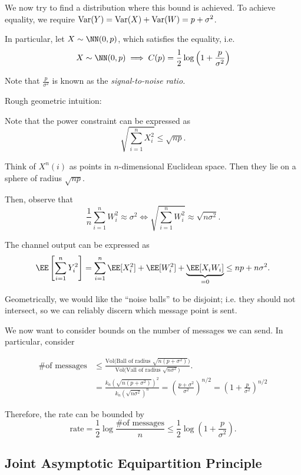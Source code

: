 We now try to find a distribution where this bound is achieved.  To achieve equality, we require $\text{Var}(Y) = \text{Var}(X) + \text{Var}(W) = p + \sigma^2$.  

In particular, let $X \sim \NN(0, p)$, which satisfies the equality, i.e.
\[
  X \sim \NN(0, p) \implies C(p) = \frac{1}{2} \log \left (1 + \frac{p}{\sigma^2} \right )
\]

Note that $\frac{p}{\sigma^2}$ is known as the {\it signal-to-noise ratio.}

Rough geometric intuition:

Note that the power constraint can be expressed as
\[
  \sqrt{\sum_{i=1}^{n} X_i^2} \leq \sqrt{np}.
\]

Think of $X^n(i)$ as points in $n$-dimensional Euclidean space.  Then they lie on a sphere of radius $\sqrt{np}$.

Then, observe that
\[
  \frac{1}{n} \sum_{i=1}^{n} W_i^2 \approx \sigma^2 \Leftrightarrow \sqrt{\sum_{i=1}^{n} W_i^2} \approx \sqrt{n\sigma^2}.
\]

The channel output can be expressed as
\[
  \EE \left [ \sum_{i=1}^{n} Y_i^2 \right ] = \sum_{i=1}^{n} \EE[X_i^2] + \EE[W_i^2] + \underbrace{\EE[X_i W_i]}_{=0} \leq np + n \sigma^2.
\]

Geometrically, we would like the ``noise balls'' to be disjoint; i.e. they should not intersect, so we can reliably discern which message point is sent.

We now want to consider bounds on the number of messages we can send.  In particular, consider

\begin{align*}
  \text{\# of messages} &\leq \frac{\text{Vol(Ball of radius $\sqrt{n (p + \sigma^2)}$)}}{\text{Vol(Vall of radius $\sqrt{n \sigma^2}$)}}. \\
    &= \frac{k_n (\sqrt{n (p + \sigma^2)})^2}{k_n (\sqrt{n \sigma^2})^n} =\left(  \frac{p + \sigma^2}{\sigma^2} \right)^{n/2} =\left(  1 + \frac{p}{\sigma^2} \right)^{n/2}
\end{align*}

Therefore, the rate can be bounded by
\[
  \text{rate} = \frac{1}{2} \log \frac{\text{\# of messages}}{n} \leq \frac{1}{2} \log\left(  1 + \frac{p}{\sigma^2} \right).
\]

\def\XX{\mathcal{X}}
\def\YY{\mathcal{Y}}
\subsection{Joint Asymptotic Equipartition Principle}

